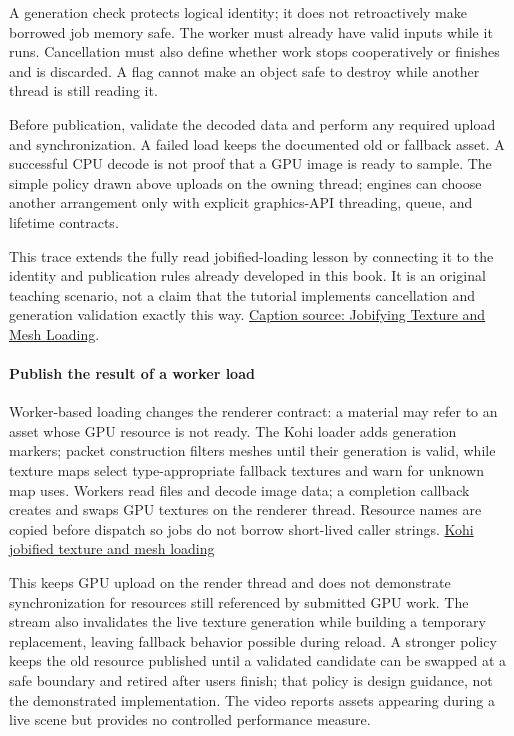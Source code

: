 A generation check protects logical identity; it does not retroactively make borrowed job memory safe. The worker must already have valid inputs while it runs. Cancellation must also define whether work stops cooperatively or finishes and is discarded. A flag cannot make an object safe to destroy while another thread is still reading it.

Before publication, validate the decoded data and perform any required upload and synchronization. A failed load keeps the documented old or fallback asset. A successful CPU decode is not proof that a GPU image is ready to sample. The simple policy drawn above uploads on the owning thread; engines can choose another arrangement only with explicit graphics-API threading, queue, and lifetime contracts.

This trace extends the fully read jobified-loading lesson by connecting it to the identity and publication rules already developed in this book. It is an original teaching scenario, not a claim that the tutorial implements cancellation and generation validation exactly this way. \href{https://www.youtube.com/watch?v=dRxw-C-eBGU}{Caption source: Jobifying Texture and Mesh Loading}.

\paragraph{Publish the result of a worker load}\label{06-engine-ii-ch027-publish-the-result-of-a-worker-load}

\hypertarget{06-engine-ii-ch027-publish-the-result-of-a-worker-load}{}

Worker-based loading changes the renderer contract: a material may refer to an asset whose GPU resource is not ready. The Kohi loader adds generation markers; packet construction filters meshes until their generation is valid, while texture maps select type-appropriate fallback textures and warn for unknown map uses. Workers read files and decode image data; a completion callback creates and swaps GPU textures on the renderer thread. Resource names are copied before dispatch so jobs do not borrow short-lived caller strings. \href{https://www.youtube.com/watch?v=dRxw-C-eBGU}{Kohi jobified texture and mesh loading}

This keeps GPU upload on the render thread and does not demonstrate synchronization for resources still referenced by submitted GPU work. The stream also invalidates the live texture generation while building a temporary replacement, leaving fallback behavior possible during reload. A stronger policy keeps the old resource published until a validated candidate can be swapped at a safe boundary and retired after users finish; that policy is design guidance, not the demonstrated implementation. The video reports assets appearing during a live scene but provides no controlled performance measure.

